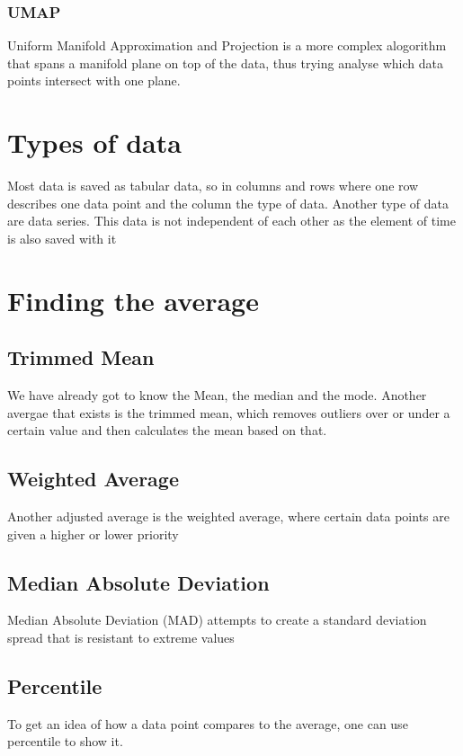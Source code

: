 \documentclass{article}
\begin{document}
	\subsubsection{UMAP}
	Uniform Manifold Approximation and Projection is a more complex alogorithm that spans a manifold plane on top of the data, thus trying analyse which data points intersect with one plane.
	\section{Types of data}
	Most data is saved as tabular data, so in columns and rows where one row describes one data point and the column the type of data. Another type of data are data series. This data is not independent of each other as the element of time is also saved with it
	\section{Finding the average}
	\subsection{Trimmed Mean}
	We have already got to know the Mean, the median and the mode. Another avergae that exists is the trimmed mean, which removes outliers over or under a certain value and then calculates the mean based on that.
	\subsection{Weighted Average}
	Another adjusted average is the weighted average, where certain data points are given a higher or lower priority
	\subsection{Median Absolute Deviation}
	Median Absolute Deviation (MAD) attempts to create a standard deviation spread that is resistant to extreme values
	\subsection{Percentile}
	To get an idea of how a data point compares to the average, one can use percentile to show it.
\end{document}
